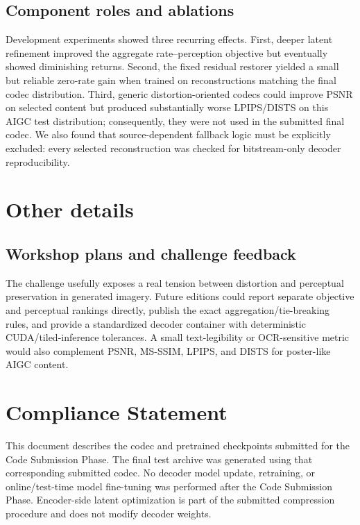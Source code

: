 \documentclass[10pt,twocolumn,letterpaper]{article}
\begin{document}
\subsection{Component roles and ablations}
Development experiments showed three recurring effects. First, deeper latent refinement improved the aggregate rate--perception objective but eventually showed diminishing returns. Second, the fixed residual restorer yielded a small but reliable zero-rate gain when trained on reconstructions matching the final codec distribution. Third, generic distortion-oriented codecs could improve PSNR on selected content but produced substantially worse LPIPS/DISTS on this AIGC test distribution; consequently, they were not used in the submitted final codec. We also found that source-dependent fallback logic must be explicitly excluded: every selected reconstruction was checked for bitstream-only decoder reproducibility.

\section{Other details}
\subsection{Workshop plans and challenge feedback}
The challenge usefully exposes a real tension between distortion and perceptual preservation in generated imagery. Future editions could report separate objective and perceptual rankings directly, publish the exact aggregation/tie-breaking rules, and provide a standardized decoder container with deterministic CUDA/tiled-inference tolerances. A small text-legibility or OCR-sensitive metric would also complement PSNR, MS-SSIM, LPIPS, and DISTS for poster-like AIGC content.

\section*{Compliance Statement}
This document describes the codec and pretrained checkpoints submitted for the Code Submission Phase. The final test archive was generated using that corresponding submitted codec. No decoder model update, retraining, or online/test-time model fine-tuning was performed after the Code Submission Phase. Encoder-side latent optimization is part of the submitted compression procedure and does not modify decoder weights.

{\small


}
\end{document}
